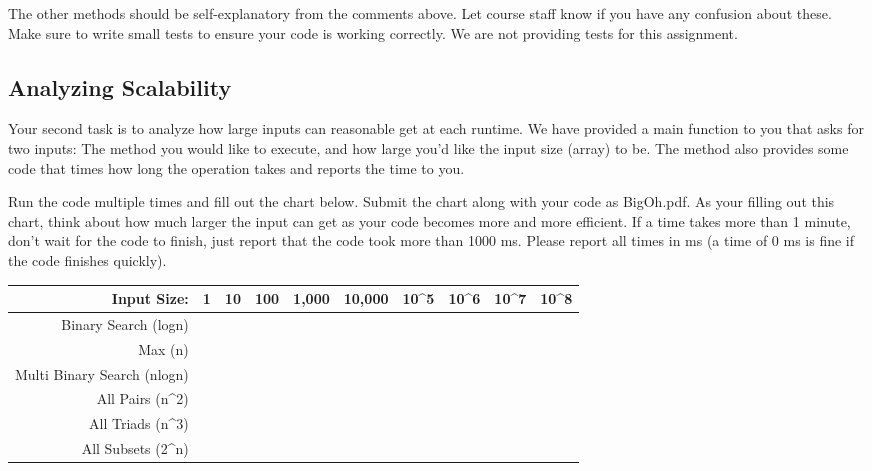 \documentclass[paper=a4, fontsize=11pt, parskip=full]{scrartcl} %
\numberwithin{equation}{section} %
\numberwithin{figure}{section} %
\numberwithin{table}{section} %
\begin{document}
The other methods should be self-explanatory from the comments above. Let course staff know if you have any confusion about these. Make sure to write small tests to ensure your code is working correctly. We are not providing tests for this assignment.


\subsection{Analyzing Scalability}

Your second task is to analyze how large inputs can reasonable get at each runtime. We have provided a main function to you that asks for two inputs: The method you would like to execute, and how large you'd like the input size (array) to be. The method also provides some code that times how long the operation takes and reports the time to you.

Run the code multiple times and fill out the chart below. Submit the chart along with your code as BigOh.pdf. As your filling out this chart, think about how much larger the input can get as your code becomes more and more efficient. If a time takes more than 1 minute, don't wait for the code to finish, just report that the code took more than 1000 ms. Please report all times in ms (a time of 0 ms is fine if the code finishes quickly). 

\renewcommand{\arraystretch}{2.0}
\begin{tabular}{|r|l|l|l|l|l|l|l|l|l|}
\hline
Input Size:                        & 1 & 10 & 100 & 1,000 & 10,000 & 10\textasciicircum{}5 & 10\textasciicircum{}6 & 10\textasciicircum{}7 & 10\textasciicircum{}8 \\ \hline
Binary Search (logn)               &   &    &     &       &        &                       &                       &                       &                       \\ \hline
Max (n)                            &   &    &     &       &        &                       &                       &                       &                       \\ \hline
Multi Binary Search (nlogn)        &   &    &     &       &        &                       &                       &                       &                       \\ \hline
All Pairs (n\textasciicircum{}2)   &   &    &     &       &        &                       &                       &                       &                       \\ \hline
All Triads (n\textasciicircum{}3)  &   &    &     &       &        &                       &                       &                       &                       \\ \hline
All Subsets (2\textasciicircum{}n) &   &    &     &       &        &                       &                       &                       &                       \\ \hline
\end{tabular}


\end{document}
